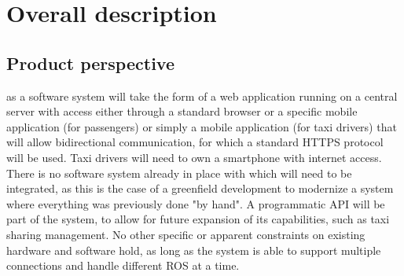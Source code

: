 \chapter{Overall description}

\section{Product perspective}
\mts{} as a software system will take the form of a web application running on a central server with access either through a standard browser or a specific mobile application (for passengers) or simply a mobile application (for taxi drivers) that will allow bidirectional communication, for which a standard HTTPS protocol will be used. Taxi drivers will need to own a smartphone with internet access. There is no software system already in place with which \mts{} will need to be integrated, as this is the case of a greenfield development to modernize a system where everything was previously done "by hand". A programmatic API will be part of the system, to allow for future expansion of its capabilities, such as taxi sharing management. No other specific or apparent constraints on existing hardware and software hold, as long as the system is able to support multiple connections and handle different ROS at a time.

